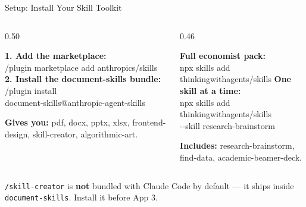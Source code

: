 \documentclass[aspectratio=169, 10pt]{beamer}
\begin{document}
\begin{frame}[fragile]{Setup: Install Your Skill Toolkit}
\begin{columns}[T]
\begin{column}{0.50\textwidth}
\begin{tcolorbox}[keybox, title={\faDownload\quad Anthropic skills (one-time)}]
\scriptsize
\textbf{1. Add the marketplace:}\\
{\tiny\ttfamily /plugin marketplace add anthropics/skills}
\vskip3pt
\textbf{2. Install the document-skills bundle:}\\
{\tiny\ttfamily /plugin install \\\hspace*{1em}document-skills@anthropic-agent-skills}
\vskip3pt
{\raggedright\textbf{Gives you:} {\fontsize{6.5}{8}\selectfont\ttfamily pdf, docx, pptx, xlsx, frontend-design, skill-creator, algorithmic-art.}\par}
\end{tcolorbox}
\end{column}
\begin{column}{0.46\textwidth}
\begin{tcolorbox}[keybox, title={\faBoxes\quad Third-party skills via \texttt{npx}}]
\scriptsize
\textbf{Full economist pack:}\\
{\tiny\ttfamily npx skills add thinkingwithagents/skills}
\vskip3pt
\textbf{One skill at a time:}\\
{\tiny\ttfamily npx skills add thinkingwithagents/skills \\\hspace*{1em}-{}-skill research-brainstorm}
\vskip3pt
{\raggedright\textbf{Includes:} {\fontsize{6.5}{8}\selectfont\ttfamily research-brainstorm, find-data, academic-beamer-deck.}\par}
\end{tcolorbox}
\end{column}
\end{columns}
\vskip4pt
\pause
\begin{tcolorbox}[colback=SoftCoral!8, colframe=SoftCoral, boxrule=0.5pt, left=5pt, right=5pt, top=2pt, bottom=2pt, halign=center]
\scriptsize \faExclamationCircle\; \texttt{/skill-creator} is \textbf{not} bundled with Claude Code by default --- it ships inside \texttt{document-skills}. Install it before App 3.
\end{tcolorbox}
\end{frame}


\end{document}
